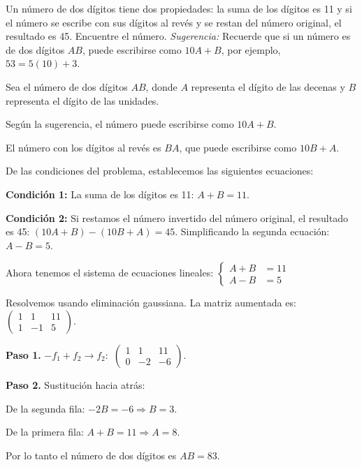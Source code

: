 \begin{prob}
Un número de dos dígitos tiene dos propiedades: la suma de los dígitos es 11 y si el número se escribe con sus dígitos al revés y se restan del número original, el resultado es 45. Encuentre el número. \textit{Sugerencia:} Recuerde que si un número es de dos dígitos $AB$, puede escribirse como $10A+B$, por ejemplo, $53=5(10)+3.$

\begin{myproof}
Sea el número de dos dígitos $AB$, donde $A$ representa el dígito de las decenas y $B$ representa el dígito de las unidades.

Según la sugerencia, el número puede escribirse como $10A + B$.

El número con los dígitos al revés es $BA$, que puede escribirse como $10B + A$.

De las condiciones del problema, establecemos las siguientes ecuaciones:

\textbf{Condición 1:} La suma de los dígitos es 11: $A + B = 11.$

\textbf{Condición 2:} Si restamos el número invertido del número original, el resultado es 45: $(10A + B) - (10B + A) = 45.$ Simplificando la segunda ecuación: $A - B = 5.$

Ahora tenemos el sistema de ecuaciones lineales: $\begin{cases}
A + B &= 11\\
A - B &= 5
\end{cases}$

Resolvemos usando eliminación gaussiana. La matriz aumentada es: $\left(\begin{array}{cc|c}
1 & 1 & 11 \\
1 & -1 & 5
\end{array}\right).$


\textbf{Paso 1.} $-f_1 + f_2 \to f_2:$ $\left(\begin{array}{cc|c}
1 & 1 & 11 \\
0 & -2 & -6
\end{array}\right).$

\textbf{Paso 2.} Sustitución hacia atrás: 

De la segunda fila: $-2B = -6\Rightarrow B = 3.$

De la primera fila: $A + B = 11\Rightarrow A = 8.$

Por lo tanto el número de dos dígitos es $AB = 83$.
\end{myproof}
\end{prob}


